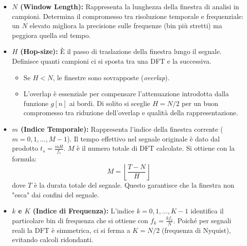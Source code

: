 \documentclass[12pt, a4paper]{article}
\begin{document}
\begin{itemize}
  \item \textbf{$N$ (Window Length):} Rappresenta la lunghezza della finestra di analisi in campioni. Determina il compromesso tra risoluzione temporale e frequenziale: un $N$ elevato migliora la precisione sulle frequenze (bin più stretti) ma peggiora quella sul tempo.

  \item \textbf{$H$ (Hop-size):} È il passo di traslazione della finestra lungo il segnale. Definisce quanti campioni ci si sposta tra una DFT e la successiva.
    \begin{itemize}
      \item Se $H < N$, le finestre sono sovrapposte (\textit{overlap}).
      \item L'overlap è essenziale per compensare l'attenuazione introdotta dalla funzione $g[n]$ ai bordi. Di solito si sceglie $H = N/2$ per un buon compromesso tra riduzione dell'overlap e qualità della rappresentazione.
    \end{itemize}

  \item \textbf{$m$ (Indice Temporale):} Rappresenta l'indice della finestra corrente ($m = 0, 1, \dots, M-1$). Il tempo effettivo nel segnale originale è dato dal prodotto $t_s=\frac{mH}{f_s}$. $M$ è il numero totale di DFT calcolate. Si ottiene con la formula:
    \[ M = \left\lfloor \frac{T - N}{H} \right\rfloor \]
    dove $T$ è la durata totale del segnale. Questo garantisce che la finestra non "esca" dai confini del segnale.

  \item \textbf{$k$ e $K$ (Indice di Frequenza):} L'indice $k = 0, 1, \dots , K-1$ identifica il particolare bin di frequenza che si ottiene con $f_k = \frac{k f_s}{N}$. Poiché per segnali reali la DFT è simmetrica, ci si ferma a $K = N/2$ (frequenza di Nyquist), evitando calcoli ridondanti.
\end{itemize}
\end{document}
